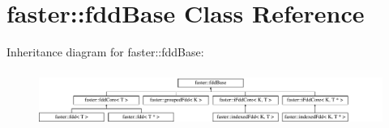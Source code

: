 \hypertarget{classfaster_1_1fddBase}{}\section{faster\+:\+:fdd\+Base Class Reference}
\label{classfaster_1_1fddBase}
Inheritance diagram for faster\+:\+:fdd\+Base\+:\begin{figure}[H]
\begin{center}
\leavevmode
\includegraphics[height=1.826087cm]{classfaster_1_1fddBase}
\end{center}
\end{figure}
